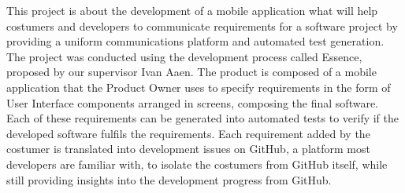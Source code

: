 This project is about the development of a mobile application what will help costumers and developers to communicate requirements for a software project by providing a uniform communications platform and automated test generation.
The project was conducted using the development process called Essence, proposed by our supervisor Ivan Aaen.
The product is composed of a mobile application that the Product Owner uses to specify requirements in the form of User Interface components arranged in screens, composing the final software.
Each of these requirements can be generated into automated tests to verify if the developed software fulfils the requirements.
Each requirement added by the costumer is translated into development issues on GitHub, a platform most developers are familiar with, to isolate the costumers from GitHub itself, while still providing insights into the development progress from GitHub.
